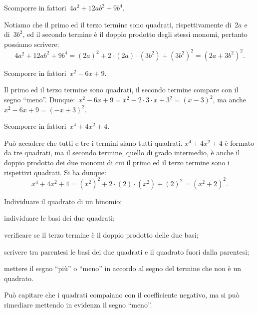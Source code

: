 \begin{exrig}
 \begin{esempio}
Scomporre in fattori~$4a^{2}+12ab^{2}+9b^{4}$.

Notiamo che il primo ed il terzo termine sono quadrati, rispettivamente di~$2a$ e di~$3b^{2}$,
ed il secondo termine è il doppio prodotto degli stessi monomi, pertanto possiamo
scrivere:
\[4a^{2}+12{ab}^{2}+9b^{4}=(2a)^{2}+2\cdot (2a)\cdot (3b^{2})+\left(3b^{2}\right)^{2}=\left(2a+3b^{2}\right)^{2}.\]
 \end{esempio}

 \begin{esempio}
Scomporre in fattori~$x^{2}-6x+9$.

Il primo ed il terzo termine sono quadrati, il secondo termine compare con il segno ``meno''.
Dunque:~$x^{2}-6x+9=x^{2}-2\cdot 3\cdot x+3^{2}=(x-3)^{2}$, ma anche~$x^{2}-6x+9=(-x+3)^{2}$.
 \end{esempio}

 \begin{esempio}
Scomporre in fattori~$x^{4}+4x^{2}+4$.

Può accadere che tutti e tre i termini siano tutti quadrati. $x^{4}+4x^{2}+4$ è formato da tre quadrati, ma il secondo termine, quello di grado intermedio,
è anche il doppio prodotto dei due monomi di cui il primo ed il terzo termine sono i rispettivi quadrati.
Si ha dunque:
\[x^{4}+4x^{2}+4=\left(x^{2}\right)^{2}+2\cdot (2)\cdot (x^{2})+(2)^{2}=\left(x^{2}+2\right)^{2}.\]
 \end{esempio}
\end{exrig}

\begin{procedura}
Individuare il quadrato di un binomio:
\begin{enumeratea}
\item individuare le basi dei due quadrati;
\item verificare se il terzo termine è il doppio prodotto delle due basi;
\item scrivere tra parentesi le basi dei due quadrati e il quadrato fuori dalla parentesi;
\item mettere il segno ``più'' o ``meno'' in accordo al segno del termine che non è un quadrato.
\end{enumeratea}
\end{procedura}

Può capitare che i quadrati compaiano con il coefficiente negativo, ma si può rimediare mettendo in evidenza il segno ``meno''.

